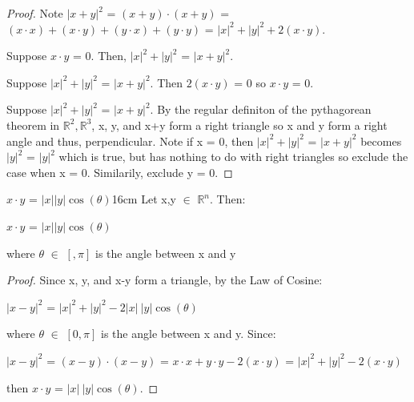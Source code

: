     \begin{proof}
        Note 
        $|x+y|^2$
        = $(x+y) \cdot (x+y)$
        = $(x \cdot x) + (x \cdot y) + (y \cdot x) + (y \cdot y)$
        = $|x|^2 + |y|^2 + 2(x \cdot y)$.

        \vspace{0.2cm}

        Suppose $x \cdot y$ = 0.
        Then, $|x|^2 + |y|^2$ = $|x+y|^2$.

        \vspace{0.2cm}

        Suppose $|x|^2 + |y|^2$ = $|x+y|^2$.
        Then $2(x \cdot y)$ = 0 so $x \cdot y$ = 0.

        \vspace{0.2cm}

        Suppose $|x|^2 + |y|^2$ = $|x+y|^2$.
        By the regular definiton of the pythagorean theorem in
        $\mathbb{R}^2,\mathbb{R}^3$, x, y, and x+y form a right triangle
        so x and y form a right angle and thus, perpendicular.
        Note if x = 0, then $|x|^2 + |y|^2$ = $|x+y|^2$
        becomes $|y|^2$ = $|y|^2$ which is true, but has nothing to do with
        right triangles so exclude the case when x = 0. Similarily, exclude y = 0.
    \end{proof}

    \vspace{0.5cm}



    \begin{wtheorem}{$x \cdot y$ = $|x| |y| \cos(\theta)$}{16cm}
        Let x,y $\in$ $\mathbb{R}^n$. Then:

        \hspace{0.5cm}
        $x \cdot y$ = $|x| |y| \cos(\theta)$

        where $\theta$ $\in$ $[,\pi]$ is the angle between x and y
    \end{wtheorem}

    \begin{proof}
        Since x, y, and x-y form a triangle, by the Law of Cosine:

        \hspace{0.5cm}
        $|x-y|^2$ = $|x|^2 + |y|^2 - 2|x| \ |y| \cos(\theta)$
        
        where $\theta$ $\in$ $[0,\pi]$ is the angle between x and y. Since:

        \hspace{0.5cm}
        $|x-y|^2$
        = $(x - y) \cdot (x - y)$
        = $x \cdot x + y \cdot y - 2(x \cdot y)$
        = $|x|^2 + |y|^2 - 2(x \cdot y)$

        then $x \cdot y$ = $|x| \ |y| \cos(\theta)$.
    \end{proof}

